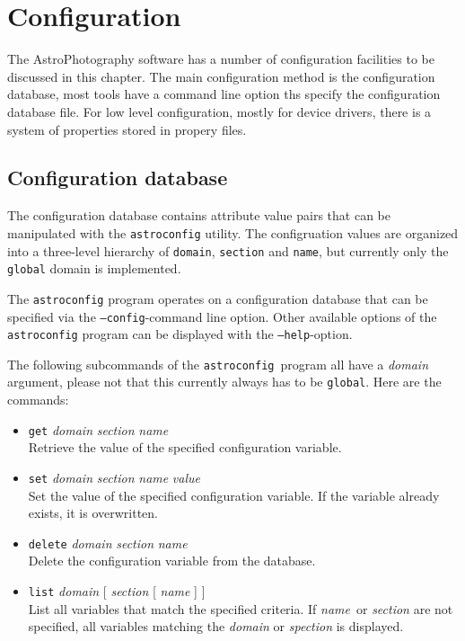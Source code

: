 \chapter{Configuration}
The AstroPhotography software has a number of configuration facilities
to be discussed in this chapter.
The main configuration method is the configuration database, most
tools have a command line option ths specify the configuration database
file.
For low level configuration, mostly for device drivers, there is a
system of properties stored in propery files.

\section{Configuration database}
The configuration database contains attribute value pairs that can be
manipulated with the \texttt{astroconfig} utility.
The configruation values are organized into a three-level hierarchy
of \texttt{domain}, \texttt{section} and \texttt{name}, but currently
only the \texttt{global} domain is implemented.

The \texttt{astroconfig} program operates on a configuration database
that can be specified via the \texttt{--config}-command line option.
Other available options of the \texttt{astroconfig} program can be
displayed with the \texttt{--help}-option.

The following subcommands of the \texttt{astroconfig} program all have
a \textit{domain} argument, please not that this currently always has to be 
\texttt{global}.
Here are the commands:
\begin{itemize}
\item
\texttt{get} \textit{domain} \textit{section} \textit{name}
\\
Retrieve the value of the specified configuration variable.
\item
\texttt{set} \textit{domain} \textit{section} \textit{name} \textit{value}
\\
Set the value of the specified configuration variable.
If the variable already exists, it is overwritten.
\item
\texttt{delete} \textit{domain} \textit{section} \textit{name}
\\
Delete the configuration variable from the database.
\item
\texttt{list} \textit{domain} [ \textit{section} [ \textit{name} ] ]
\\
List all variables that match the specified criteria.
If \textit{name} or \textit{section} are not specified, all variables
matching the \textit{domain} or \textit{spection} is displayed.
\end{itemize}

